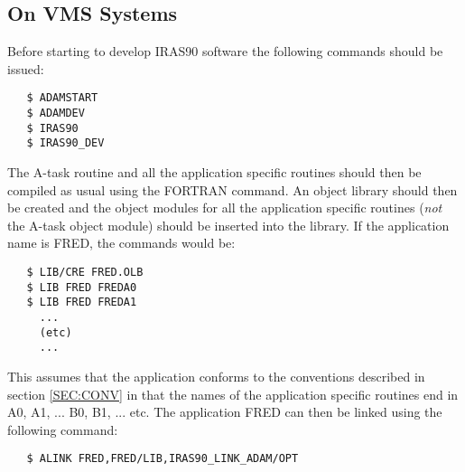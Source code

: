 \subsection{On VMS Systems}
Before starting to develop {\small IRAS90} software the following commands 
should be issued:

\small
\begin{verbatim}
   $ ADAMSTART
   $ ADAMDEV
   $ IRAS90
   $ IRAS90_DEV
\end{verbatim}
\normalsize

The A-task routine and all the application specific routines should then be
compiled as usual using the {\small FORTRAN} command. An object library should
then be created and the object modules for all the application specific routines
({\em not} the A-task object module) should be inserted into the library. If the
application name is {\small FRED}, the commands would be: 

\small 
\begin{verbatim}
   $ LIB/CRE FRED.OLB
   $ LIB FRED FREDA0
   $ LIB FRED FREDA1
     ...  
     (etc)
     ...
\end{verbatim}
\normalsize

This assumes that the application conforms to the conventions described in
section \ref{SEC:CONV} in that the names of the application specific routines
end in {\small A0, A1, ... B0, B1, ... } etc. The application FRED can then be
linked using the following command: 

\small
\begin{verbatim}
   $ ALINK FRED,FRED/LIB,IRAS90_LINK_ADAM/OPT
\end{verbatim}
\normalsize

